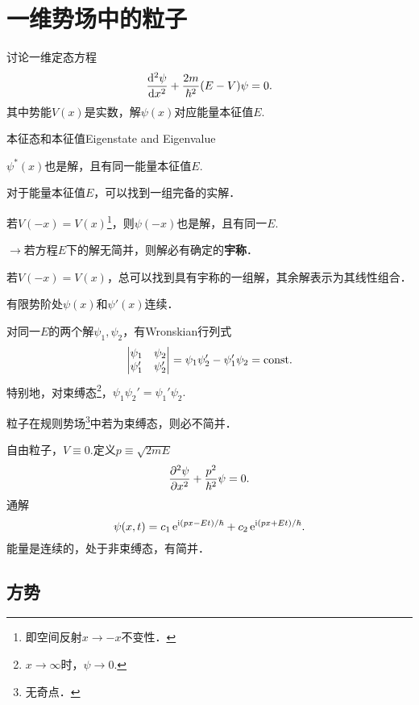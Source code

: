 \chapter[一维势场]{一维势场中的粒子}
讨论一维定态方程
\begin{align}
	\dv[2]\psi{x}+\frac{2m}{\hbar^2}(E-V)\psi=0.
\end{align}
其中势能$V(x)$是实数，解$\psi(x)$对应能量本征值$E.$
\begin{theorem}{本征态和本征值}{Eigenstate and Eigenvalue}
	\begin{compactenum}
		\item $\psi^*(x)$也是解，且有同一能量本征值$E.$
		\item 对于能量本征值$E$，可以找到一组完备的实解．
		\item 若$V(-x)=V(x)$\footnote{即空间反射$x\to-x$不变性．}，则$\psi(-x)$也是解，且有同一$E.$

		$\to$若方程$E$下的解无简并，则解必有确定的\textbf{宇称}．
		\item 若$V(-x)=V(x)$，总可以找到具有宇称的一组解，其余解表示为其线性组合．
		\item 有限势阶处$\psi(x)$和$\psi'(x)$连续．
		\item 对同一$E$的两个解$\psi_1,\psi_2$，有Wronskian行列式
		\renewcommand\arraystretch{1}
		\begin{align*}
			\begin{vmatrix}
				\psi_1  & \psi_2  \\
				\psi_1' & \psi_2'
			\end{vmatrix}=\psi_1\psi_2'-\psi_1'\psi_2=\const.
		\end{align*}
		\renewcommand\arraystretch{.82}
		特别地，对束缚态\footnote{$x\to\infty$时，$\psi\to 0.$}，$\psi_1\psi_2'=\psi_1'\psi_2.$
		\item 粒子在规则势场\footnote{无奇点．}中若为束缚态，则必不简并．
	\end{compactenum}
\end{theorem}
自由粒子，$V\equiv 0.$定义$p\equiv\sqrt{2mE}$
\[
	\pv[2]\psi{x}+\frac{p^2}{\hbar^2}\psi=0.
\]
通解
\[
	\psi(x,t)=c_1\e{\i(px-Et)/\hbar}+c_2\e{\i(px+Et)/\hbar}.
\]
能量是连续的，处于非束缚态，有简并．

\section{方势}

